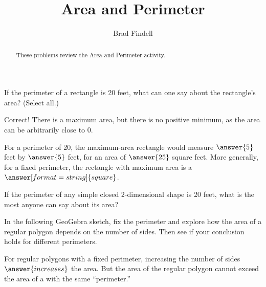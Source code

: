 \documentclass[nooutcomes]{ximera}
\title{Area and Perimeter}
\author{Brad Findell}
\begin{document}
\begin{abstract}
These problems review the Area and Perimeter activity.  
\end{abstract}
\maketitle

%
%
%
%

\begin{problem}
If the perimeter of a rectangle is 20 feet, what can one say about the rectangle's area?  (Select all.)

\begin{selectAll}
\end{selectAll}

\begin{problem}

Correct!  There is a maximum area, but there is no positive minimum, as the area can be arbitrarily close to 0.  

For a perimeter of 20, the maximum-area rectangle would measure $\answer{5}$ feet by $\answer{5}$ feet, for an area of $\answer{25}$ square feet.  More generally, for a fixed perimeter, the rectangle with maximum area is a $\answer[format=string]{square}$.

\begin{problem}
If the perimeter of any simple closed 2-dimensional shape is 20 feet, what is the most anyone can say about its area?

In the following GeoGebra sketch, fix the perimeter and explore how the area of a regular polygon depends on the number of sides.  Then see if your conclusion holds for different perimeters.  
\begin{center}  
\end{center}
For regular polygons with a fixed perimeter, increasing the number of sides
$\answer{increases}$ the area.  But the area of the regular polygon cannot 
exceed the area of a 
with the same ``perimeter.''


\end{problem}
\end{problem}
\end{problem}
\end{document}
